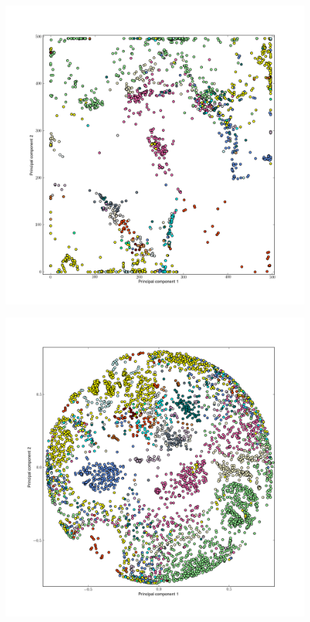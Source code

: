 \begin{description}
\begin{figure}[H]		
	\begin{minipage}{0.50\textwidth}		 	
	\includegraphics[trim=4cm 3cm 2cm 2cm,clip, width=\textwidth]{./img/SOM2_taxa.png}
	\label{figSOM2}
	\end{minipage}
	\begin{minipage}{0.50\textwidth}
	\includegraphics[trim=4cm 3cm 2cm 2cm,clip, width=\textwidth]{./img/MDS_taxa.png}

\end{minipage}
\end{figure}
\end{description}
